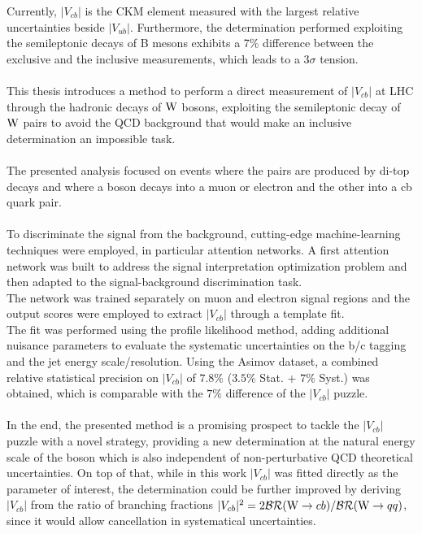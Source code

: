 \label{sec:END}
\vspace{-1cm}
Currently, $|V_{cb}|$ is the CKM element measured with the largest relative uncertainties beside $|V_{ub}|$. Furthermore, the determination performed exploiting the semileptonic decays of B mesons exhibits a 7\% difference between the exclusive and the inclusive measurements, which leads to a $3\sigma$ tension.\\
\\
This thesis introduces a method to perform a direct measurement of $|V_{cb}|$ at LHC through the hadronic decays of ${\text{W}}$ bosons, exploiting the semileptonic decay of ${\text{W}}$ pairs to avoid the QCD background that would make an inclusive determination an impossible task.
\\
\\
The presented analysis focused on events where the \PW pairs are produced by di-top decays and where a \PW boson decays into a muon or electron and the other into a cb quark pair.\\
\\
To discriminate the signal from the background, cutting-edge machine-learning techniques were employed, in particular attention networks. 
A first attention network was built to address the signal interpretation optimization problem and then adapted to the signal-background discrimination task.\\
The network was trained separately on muon and electron signal regions and the output scores were employed to extract $|V_{cb}|$ through a template fit.\\
The fit was performed using the profile likelihood method, adding additional nuisance parameters to evaluate the systematic uncertainties on the b/c tagging and the jet energy scale/resolution.
Using the Asimov dataset, a combined relative statistical precision on $|V_{cb}|$ of $7.8\%$ ($3.5\%$ Stat. + $7\%$ Syst.) was obtained, which is comparable with the $7\%$ difference of the $|V_{cb}|$ puzzle.
\\
\\
In the end, the presented method is a promising prospect to tackle the $|V_{cb}|$ puzzle with a novel strategy, providing a new determination at the natural energy scale of the \PW boson which is also independent of non-perturbative QCD theoretical uncertainties.
On top of that, while in this work $|V_{cb}|$ was fitted directly as the parameter of interest, the determination could be further improved by deriving $|V_{cb}|$ from the ratio of branching fractions $|V_{cb}|^2=2\mathcal{BR}({\text{W}} \to cb)/\mathcal{BR}({\text{W}} \to qq)$, since it would allow cancellation in systematical uncertainties.
